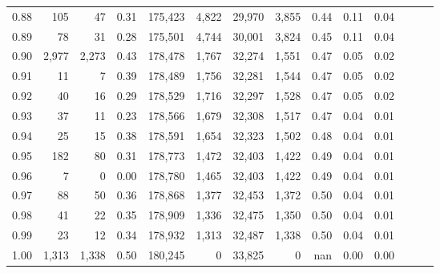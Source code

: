 \begin{tabular}{rrrrrrrrrrrrrr}
0.88 &     105 &     47 &  0.31 &  175,423 &    4,822 &  29,970 &   3,855 &  0.44 &  0.11 &      0.04 \\
0.89 &      78 &     31 &  0.28 &  175,501 &    4,744 &  30,001 &   3,824 &  0.45 &  0.11 &      0.04 \\
0.90 &   2,977 &  2,273 &  0.43 &  178,478 &    1,767 &  32,274 &   1,551 &  0.47 &  0.05 &      0.02 \\
0.91 &      11 &      7 &  0.39 &  178,489 &    1,756 &  32,281 &   1,544 &  0.47 &  0.05 &      0.02 \\
0.92 &      40 &     16 &  0.29 &  178,529 &    1,716 &  32,297 &   1,528 &  0.47 &  0.05 &      0.02 \\
0.93 &      37 &     11 &  0.23 &  178,566 &    1,679 &  32,308 &   1,517 &  0.47 &  0.04 &      0.01 \\
0.94 &      25 &     15 &  0.38 &  178,591 &    1,654 &  32,323 &   1,502 &  0.48 &  0.04 &      0.01 \\
0.95 &     182 &     80 &  0.31 &  178,773 &    1,472 &  32,403 &   1,422 &  0.49 &  0.04 &      0.01 \\
0.96 &       7 &      0 &  0.00 &  178,780 &    1,465 &  32,403 &   1,422 &  0.49 &  0.04 &      0.01 \\
0.97 &      88 &     50 &  0.36 &  178,868 &    1,377 &  32,453 &   1,372 &  0.50 &  0.04 &      0.01 \\
0.98 &      41 &     22 &  0.35 &  178,909 &    1,336 &  32,475 &   1,350 &  0.50 &  0.04 &      0.01 \\
0.99 &      23 &     12 &  0.34 &  178,932 &    1,313 &  32,487 &   1,338 &  0.50 &  0.04 &      0.01 \\
1.00 &   1,313 &  1,338 &  0.50 &  180,245 &        0 &  33,825 &       0 &   nan &  0.00 &      0.00 \\
\bottomrule
\end{tabular}
